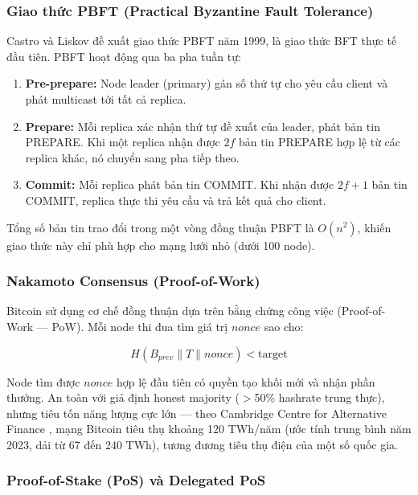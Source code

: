 \subsubsection{Giao thức PBFT (Practical Byzantine Fault Tolerance)}

Castro và Liskov \cite{castro1999practical} đề xuất giao thức PBFT năm 1999, là giao thức BFT thực tế đầu tiên. PBFT hoạt động qua ba pha tuần tự:

\begin{enumerate}
    \item \textbf{Pre-prepare:} Node leader (primary) gán số thứ tự cho yêu cầu client và phát multicast tới tất cả replica.
    \item \textbf{Prepare:} Mỗi replica xác nhận thứ tự đề xuất của leader, phát bản tin PREPARE. Khi một replica nhận được $2f$ bản tin PREPARE hợp lệ từ các replica khác, nó chuyển sang pha tiếp theo.
    \item \textbf{Commit:} Mỗi replica phát bản tin COMMIT. Khi nhận được $2f + 1$ bản tin COMMIT, replica thực thi yêu cầu và trả kết quả cho client.
\end{enumerate}

Tổng số bản tin trao đổi trong một vòng đồng thuận PBFT là $O(n^2)$, khiến giao thức này chỉ phù hợp cho mạng lưới nhỏ (dưới 100 node).

\subsubsection{Nakamoto Consensus (Proof-of-Work)}

Bitcoin sử dụng cơ chế đồng thuận dựa trên bằng chứng công việc (Proof-of-Work --- PoW). Mỗi node thi đua tìm giá trị $nonce$ sao cho:

\begin{equation}
H(B_{prev} \| T \| nonce) < \text{target}
\end{equation}

Node tìm được $nonce$ hợp lệ đầu tiên có quyền tạo khối mới và nhận phần thưởng. An toàn với giả định honest majority ($>$50\% hashrate trung thực), nhưng tiêu tốn năng lượng cực lớn --- theo Cambridge Centre for Alternative Finance \cite{cambridge2023bitcoin}, mạng Bitcoin tiêu thụ khoảng 120 TWh/năm (ước tính trung bình năm 2023, dải từ 67 đến 240 TWh), tương đương tiêu thụ điện của một số quốc gia.

\subsubsection{Proof-of-Stake (PoS) và Delegated PoS}

